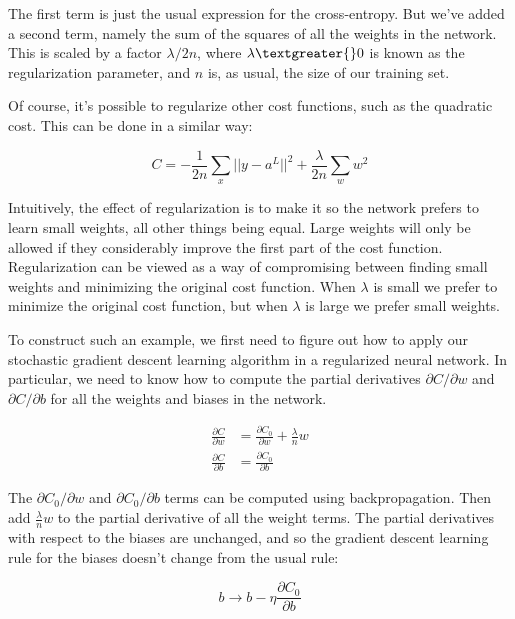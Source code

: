 \documentclass[12 pt]{article}
\begin{document}
The first term is just the usual expression for the cross-entropy. But
we've added a second term, namely the sum of the squares of all the
weights in the network. This is scaled by a factor $ \lambda / 2n $,
where $ \lambda \textgreater{} 0 $ is known as the regularization
parameter, and $ n $ is, as usual, the size of our training set.

Of course, it's possible to regularize other cost functions, such as the
quadratic cost. This can be done in a similar way:

\begin{equation}
    C = -\frac{1}{2n} \sum_x || y - a^L ||^2 +
    \frac{\lambda}{2n} \sum_w w^2
\end{equation}

Intuitively, the effect of regularization is to make it so the network
prefers to learn small weights, all other things being equal. Large
weights will only be allowed if they considerably improve the first part
of the cost function. Regularization can be viewed as a way of
compromising between finding small weights and minimizing the original
cost function. When $ \lambda $ is small we prefer to minimize the
original cost function, but when $ \lambda $ is large we prefer small
weights.

To construct such an example, we first need to figure out how to apply
our stochastic gradient descent learning algorithm in a regularized
neural network. In particular, we need to know how to compute the
partial derivatives $ \partial C / \partial w $ and $ \partial C /
\partial b $ for all the weights and biases in the network.

\begin{equation}
    \begin{split}
        \frac{\partial C}{\partial w} & = \frac{\partial C_0}{\partial w} +
        \frac{\lambda}{n} w \\
        \frac{\partial C}{\partial b} & = \frac{\partial C_0}{\partial b}
    \end{split}
\end{equation}

The $ \partial C_0 / \partial w $ and $ \partial C_0 / \partial b $
terms can be computed using backpropagation. Then add
$ \frac{\lambda}{n} w $ to the partial derivative of all the weight
terms. The partial derivatives with respect to the biases are unchanged,
and so the gradient descent learning rule for the biases doesn't change
from the usual rule:

\begin{equation}
    b \to b − \eta \frac{\partial C_0}{\partial b}
\end{equation}
\end{document}
